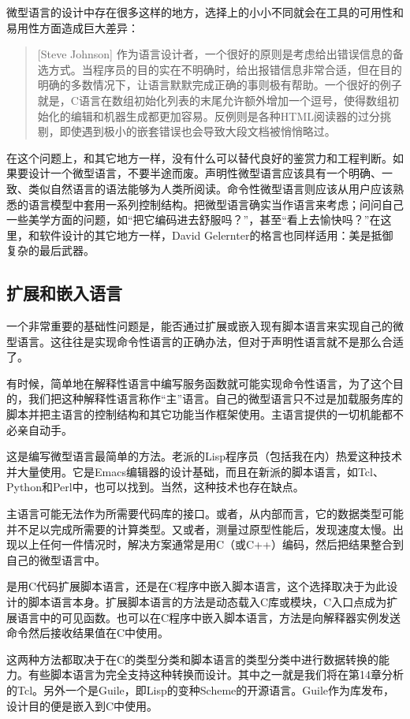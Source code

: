 \documentclass[12pt,oneside]{book}
\begin{document}
微型语言的设计中存在很多这样的地方，选择上的小小不同就会在工具的可用性和易用性方面造成巨大差异：
\begin{quote}[Steve Johnson]
作为语言设计者，一个很好的原则是考虑给出错误信息的备选方式。当程序员的目的实在不明确时，给出报错信息非常合适，但在目的明确的多数情况下，让语言默默完成正确的事则极有帮助。一个很好的例子就是，C语言在数组初始化列表的末尾允许额外增加一个逗号，使得数组初始化的编辑和机器生成都更加容易。反例则是各种HTML阅读器的过分挑剔，即使遇到极小的嵌套错误也会导致大段文档被悄悄略过。
\end{quote}

在这个问题上，和其它地方一样，没有什么可以替代良好的鉴赏力和工程判断。如果要设计一个微型语言，不要半途而废。声明性微型语言应该具有一个明确、一致、类似自然语言的语法能够为人类所阅读。命令性微型语言则应该从用户应该熟悉的语言模型中套用一系列控制结构。把微型语言确实当作语言来考虑；问问自己一些美学方面的问题，如“把它编码进去舒服吗？”，甚至“看上去愉快吗？”在这里，和软件设计的其它地方一样，David Gelernter的格言也同样适用：美是抵御复杂的最后武器。

\subsection{扩展和嵌入语言}
一个非常重要的基础性问题是，能否通过扩展或嵌入现有脚本语言来实现自己的微型语言。这往往是实现命令性语言的正确办法，但对于声明性语言就不是那么合适了。

有时候，简单地在解释性语言中编写服务函数就可能实现命令性语言，为了这个目的，我们把这种解释性语言称作“主”语言。自己的微型语言只不过是加载服务库的脚本并把主语言的控制结构和其它功能当作框架使用。主语言提供的一切机能都不必亲自动手。

这是编写微型语言最简单的方法。老派的Lisp程序员（包括我在内）热爱这种技术并大量使用。它是Emacs编辑器的设计基础，而且在新派的脚本语言，如Tcl、Python和Perl中，也可以找到。当然，这种技术也存在缺点。

主语言可能无法作为所需要代码库的接口。或者，从内部而言，它的数据类型可能并不足以完成所需要的计算类型。又或者，测量过原型性能后，发现速度太慢。出现以上任何一件情况时，解决方案通常是用C（或C++）编码，然后把结果整合到自己的微型语言中。

是用C代码扩展脚本语言，还是在C程序中嵌入脚本语言，这个选择取决于为此设计的脚本语言本身。扩展脚本语言的方法是动态载入C库或模块，C入口点成为扩展语言中的可见函数。也可以在C程序中嵌入脚本语言，方法是向解释器实例发送命令然后接收结果值在C中使用。

这两种方法都取决于在C的类型分类和脚本语言的类型分类中进行数据转换的能力。有些脚本语言为完全支持这种转换而设计。其中之一就是我们将在第14章分析的Tcl。另外一个是Guile，即Lisp的变种Scheme的开源语言。Guile作为库发布，设计目的便是嵌入到C中使用。
\end{document}
